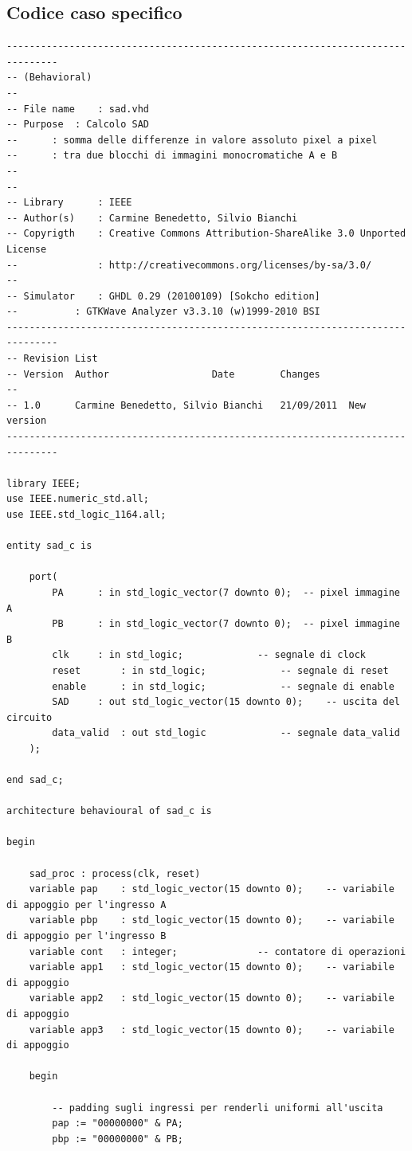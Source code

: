 \documentclass[12pt, a4paper]{article}
\begin{document}
\subsection{Codice caso specifico}
{\fontsize{8}{8}
\begin{verbatim}
-------------------------------------------------------------------------------
-- (Behavioral)
--
-- File name	: sad.vhd
-- Purpose	: Calcolo SAD 
--		: somma delle differenze in valore assoluto pixel a pixel
--		: tra due blocchi di immagini monocromatiche A e B
--
--
-- Library   	: IEEE
-- Author(s) 	: Carmine Benedetto, Silvio Bianchi
-- Copyrigth 	: Creative Commons Attribution-ShareAlike 3.0 Unported License
--           	: http://creativecommons.org/licenses/by-sa/3.0/
--
-- Simulator 	: GHDL 0.29 (20100109) [Sokcho edition]
--	     	: GTKWave Analyzer v3.3.10 (w)1999-2010 BSI	
-------------------------------------------------------------------------------
-- Revision List
-- Version	Author					Date		Changes
--
-- 1.0		Carmine Benedetto, Silvio Bianchi	21/09/2011	New version
-------------------------------------------------------------------------------

library IEEE;
use IEEE.numeric_std.all;
use IEEE.std_logic_1164.all;

entity sad_c is

	port(
		PA		: in std_logic_vector(7 downto 0);	-- pixel immagine A
		PB		: in std_logic_vector(7 downto 0);	-- pixel immagine B
		clk		: in std_logic;				-- segnale di clock
		reset		: in std_logic;				-- segnale di reset
		enable		: in std_logic;				-- segnale di enable
		SAD		: out std_logic_vector(15 downto 0);	-- uscita del circuito
		data_valid	: out std_logic				-- segnale data_valid
	);

end sad_c;

architecture behavioural of sad_c is

begin

	sad_proc : process(clk, reset)
	variable pap 	: std_logic_vector(15 downto 0);	-- variabile di appoggio per l'ingresso A
	variable pbp 	: std_logic_vector(15 downto 0);	-- variabile di appoggio per l'ingresso B
	variable cont	: integer;				-- contatore di operazioni
	variable app1 	: std_logic_vector(15 downto 0);	-- variabile di appoggio
	variable app2 	: std_logic_vector(15 downto 0);	-- variabile di appoggio
	variable app3 	: std_logic_vector(15 downto 0);	-- variabile di appoggio

	begin

		-- padding sugli ingressi per renderli uniformi all'uscita
		pap := "00000000" & PA;	
		pbp := "00000000" & PB;


\end{verbatim}}
\end{document}
